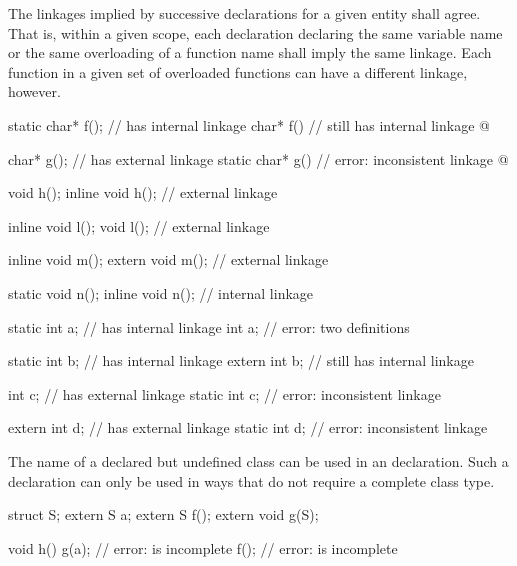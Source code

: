 \pnum
The linkages implied by successive declarations for a given entity shall
agree. That is, within a given scope, each declaration declaring the
same variable name or the same overloading of a function name shall imply
the same linkage. Each function in a given set of overloaded functions
can have a different linkage, however.
\begin{example}
%
\begin{codeblock}
static char* f();               //  has internal linkage
char* f()                       //  still has internal linkage
  { @\commentellip@ }

char* g();                      //  has external linkage
static char* g()                // error: inconsistent linkage
  { @\commentellip@ }

void h();
inline void h();                // external linkage

inline void l();
void l();                       // external linkage

inline void m();
extern void m();                // external linkage

static void n();
inline void n();                // internal linkage

static int a;                   //  has internal linkage
int a;                          // error: two definitions

static int b;                   //  has internal linkage
extern int b;                   //  still has internal linkage

int c;                          //  has external linkage
static int c;                   // error: inconsistent linkage

extern int d;                   //  has external linkage
static int d;                   // error: inconsistent linkage
\end{codeblock}
\end{example}

\pnum
{}%
The name of a declared but undefined class can be used in an
 declaration. Such a declaration can only be used in ways
that do not require a complete class type.
\begin{example}
\begin{codeblock}
struct S;
extern S a;
extern S f();
extern void g(S);

void h() {
  g(a);                         // error:  is incomplete
  f();                          // error:  is incomplete
}
\end{codeblock}
\end{example}

